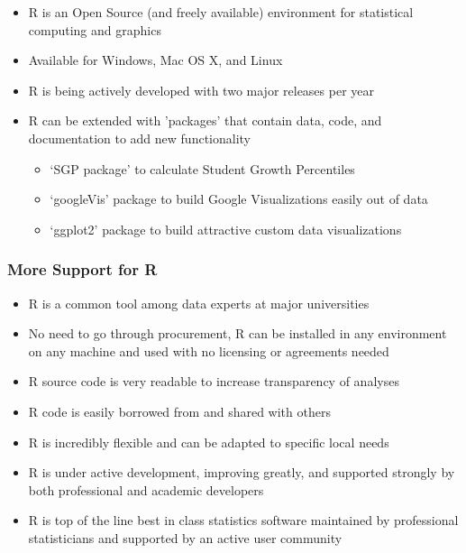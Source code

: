\documentclass{beamer}
\begin{document}
\begin{frame}
  \begin{itemize}
  \item R is an Open Source (and freely available) environment for statistical computing and graphics
  \item Available for Windows, Mac OS X, and Linux
  \item R is being actively developed with two major releases per year
  \item R can be extended with 'packages' that contain data, code, and documentation to add new functionality
    \begin{itemize}
    \item `SGP package' to calculate Student Growth Percentiles
    \item `googleVis' package to build Google Visualizations easily out of data
    \item `ggplot2' package to build attractive custom data visualizations
    \end{itemize}
  \end{itemize}
\end{frame}

\begin{frame}
\frametitle{More Support for R}
  \begin{itemize}
  \item R is a common tool among data experts at major universities
  \item No need to go through procurement, R can be installed in any environment on any machine and used with no licensing or agreements needed
  \item R source code is very readable to increase transparency of analyses
  \item R code is easily borrowed from and shared with others
  \item R is incredibly flexible and can be adapted to specific local needs
  \item R is under active development, improving greatly, and supported strongly by both professional and academic developers
  \item R is top of the line best in class statistics software maintained by professional statisticians and supported by an active user community
  \end{itemize}
\end{frame}
\end{document}

